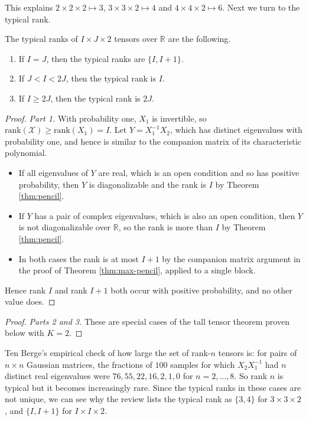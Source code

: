   This explains $2 \times 2 \times 2 \mapsto 3$, $3 \times 3 \times 2 \mapsto 4$ and $4 \times 4 \times 2 \mapsto 6$. Next we turn to the typical rank.

  \begin{theorem}
    \label{thm:typical-pencil}
    The typical ranks of $I \times J \times 2$ tensors over $\mathbb{R}$ are the following.
    \begin{enumerate}
      \item If $I = J$, then the typical ranks are $\{I, I+1\}$.
      \item If $J < I < 2J$, then the typical rank is $I$.
      \item If $I \geq 2J$, then the typical rank is $2J$.
    \end{enumerate}
  \end{theorem}
  \begin{proof}
    \textit{Part 1.} With probability one, $X_1$ is invertible, so $\mathrm{rank}(\mathcal{X}) \geq \mathrm{rank}(X_1) = I$. Let $Y = X_1^{-1} X_2$, which has distinct eigenvalues with probability one, and hence is similar to the companion matrix of its characteristic polynomial.
    \begin{itemize}
      \item If all eigenvalues of $Y$ are real, which is an open condition and so has positive probability, then $Y$ is diagonalizable and the rank is $I$ by Theorem \ref{thm:pencil}.
      \item If $Y$ has a pair of complex eigenvalues, which is also an open condition, then $Y$ is not diagonalizable over $\mathbb{R}$, so the rank is more than $I$ by Theorem \ref{thm:pencil}.
      \item In both cases the rank is at most $I + 1$ by the companion matrix argument in the proof of Theorem \ref{thm:max-pencil}, applied to a single block.
    \end{itemize}
    Hence rank $I$ and rank $I+1$ both occur with positive probability, and no other value does.
  \end{proof}
  \begin{proof}
    \textit{Parts 2 and 3.} These are special cases of the tall tensor theorem proven below with $K = 2$.
  \end{proof}

  Ten Berge's empirical check of how large the set of rank-$n$ tensors is: for pairs of $n \times n$ Gaussian matrices, the fractions of $100$ samples for which $X_2 X_1^{-1}$ had $n$ distinct real eigenvalues were $76, 55, 22, 16, 2, 1, 0$ for $n = 2, \ldots, 8$. So rank $n$ is typical but it becomes increasingly rare. Since the typical ranks in these cases are not unique, we can see why the review lists the typical rank as $\{3, 4\}$ for $3 \times 3 \times 2$, and $\{I, I+1\}$ for $I \times I \times 2$.

